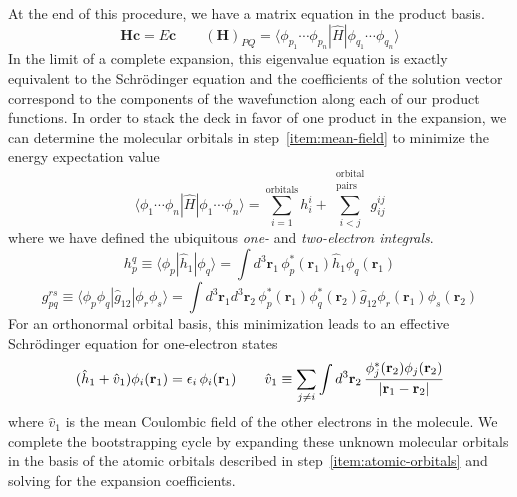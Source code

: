 At the end of this procedure, we have a matrix equation in the product basis.
\begin{equation}
    \mathbf{H}\mathbf{c}
    =
    E\mathbf{c}
    \qquad
    (\mathbf{H})_{PQ}
    =
    \langle \phi_{p_1}\cdots \phi_{p_n}|
    \hat{H}
    |\phi_{q_1}\cdots \phi_{q_n} \rangle
\end{equation}
In the limit of a complete expansion, this eigenvalue equation is exactly
equivalent to the Schr\"odinger equation and the coefficients of the solution
vector correspond to the components of the wavefunction along each of our
product functions.
In order to stack the deck in favor of one product in the expansion, we can
determine the molecular orbitals in step~\ref{item:mean-field} to minimize the
energy expectation value
\begin{equation}
    \label{eq:introduction:orbital-product-expectation-value}
    \langle \phi_1\cdots \phi_n|
    \hat{H}
    |\phi_1\cdots \phi_n \rangle
    =
    \sum_{i=1}^\mathrm{orbitals}
    h_i^i
    +
    \sum_{i<j}^{\substack{\mathrm{orbital}\\\mathrm{pairs}}}
    g_{ij}^{ij}
\end{equation}
where we have defined the ubiquitous {\itshape one-} and {\itshape two-electron
integrals}.
\begin{equation}
    h_p^q
    \equiv
    \langle\phi_p|\hat{h}_1|\phi_q\rangle
    =
    \int
    d^3\mathbf{r}_1\,
    \phi_p^*(\mathbf{r}_1)
    \hat{h}_1
    \phi_q(\mathbf{r}_1)
\end{equation}
\begin{equation}
    g_{pq}^{rs}
    \equiv
    \langle\phi_p\phi_q|\hat{g}_{12}|\phi_r\phi_s\rangle
    =
    \int
    d^3\mathbf{r}_1
    d^3\mathbf{r}_2\,
    \phi_p^*(\mathbf{r}_1)
    \phi_q^*(\mathbf{r}_2)
    \hat{g}_{12}
    \phi_r(\mathbf{r}_1)
    \phi_s(\mathbf{r}_2)
\end{equation}
For an orthonormal orbital basis, this minimization leads to an effective
Schr\"odinger equation for one-electron states
\begin{equation}
    \label{eq:introduction:mean-field-orbitals}
    (
        \hat{h}_1
        +
        \hat{v}_1
    )
    \phi_i(\mathbf{r}_1)
    =
    \epsilon_i\,
    \phi_i(\mathbf{r}_1)
    \qquad
    \hat{v}_1
    \equiv
    \sum_{j\neq i}
    \int
    d^3\mathbf{r}_2\,
    \frac{%
        \phi_j^*(\mathbf{r}_2)\phi_j(\mathbf{r}_2)
    }{%
        |\mathbf{r}_1 - \mathbf{r}_2|
    }
\end{equation}
where \(\hat{v}_1\) is the mean Coulombic field of the other electrons in the
molecule.
We complete the bootstrapping cycle by expanding these unknown molecular
orbitals in the basis of the atomic orbitals described in
step~\ref{item:atomic-orbitals} and solving for the expansion coefficients.

